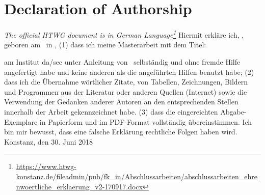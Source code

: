 \chapter*{Declaration of Authorship} %
\textit{The official HTWG document is in German Language\footnote{\url{https://www.htwg-konstanz.de/fileadmin/pub/fk_in/Abschlussarbeiten/abschlussarbeiten_ehrenwoertliche_erklaerung_v2-170917.docx}}}
\newline
\newline
Hiermit erkläre ich, \theAuthor, geboren am \DoB\ in \PoB,
\newline
\newline
(1) dass ich meine Masterarbeit mit dem Titel:
\begin{center}
	\textbf{\theTitle}
\end{center}
am Institut da/sec unter Anleitung von \supVis\ selbständig und ohne fremde Hilfe angefertigt habe und keine anderen als die angeführten Hilfen benutzt habe;
\newline
\newline
(2) dass ich die Übernahme wörtlicher Zitate, von Tabellen, Zeichnungen, Bildern und Programmen aus der Literatur oder anderen Quellen (Internet) sowie die Verwendung der Gedanken anderer Autoren an den entsprechenden Stellen innerhalb der Arbeit gekennzeichnet habe.
\newline
\newline
(3) dass die eingereichten Abgabe-Exemplare in Papierform und im PDF-Format vollständig übereinstimmen.
\newline
\newline
Ich bin mir bewusst, dass eine falsche Erklärung rechtliche Folgen haben wird.
\vspace{70pt}
\newline
Konstanz, den 30. Juni 2018
\newline





